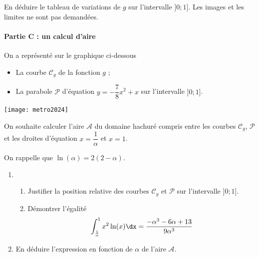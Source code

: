 \documentclass[11pt,fleqn, openany]{book} %
\begin{document}
\begin{exercise}[subtitle={(Métropole 2024)}]
\begin{enumerate}
\begin{enumerate}
\begin{center}
\end{center}

En déduire le tableau de variations de $g$ sur l'intervalle $]0;1]$. Les images et les limites ne sont pas demandées.
\end{enumerate}
\end{enumerate}


\paragraph{Partie C : un calcul d'aire}

On a représenté sur le graphique ci-dessous
\begin{itemize}
\item La courbe $\mathcal{C}_g$ de la fonction $g$ ;
\item La parabole $\mathcal{P}$ d'équation $y=-\dfrac{7}{8}x^2+x$ sur l'intervalle $]0;1]$.
\end{itemize}

\begin{center}
\texttt{[image: metro2024]}
\end{center}

On souhaite calculer l'aire $\mathcal{A}$ du domaine hachuré compris entre les courbes $\mathcal{C}_g$, $\mathcal{P}$ et les droites d'équation $x=\dfrac{1}{\alpha}$ et $x=1$.

On rappelle que $\ln(\alpha)=2(2-\alpha)$.

\begin{enumerate}
\item \begin{enumerate}
\item Justifier la position relative des courbes $\mathcal{C}_g$ et $\mathcal{P}$ sur l'intervalle $]0;1]$.
\item Démontrer l'égalité
\[\displaystyle\int_{\frac{1}{\alpha}}^1 x^2 \ln(x) \dx = \dfrac{-\alpha ^3 -6\alpha +13}{9\alpha ^3}\]
\end{enumerate}
\item En déduire l'expression en fonction de $\alpha$ de l'aire $\mathcal{A}$.
\end{enumerate}

\end{exercise}
\end{document}
